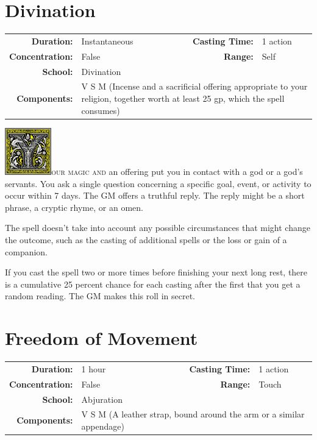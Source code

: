\documentclass[12pt,showtrims]{memoir}
\begin{document}
\section*{Divination}
{
\small\centering\vspace{-6pt}
\begin{tabular}{rlrl}
\toprule

\textbf{Duration:} & Instantaneous &
\textbf{Casting Time:} & 1 action \\
\textbf{Concentration:} & False &
\textbf{Range:} & Self \\
\textbf{School:} & Divination \\
\textbf{Components:} & \multicolumn{3}{p{0.7\textwidth}}{ V S M (Incense and a
sacrificial offering appropriate to your religion, together worth at least 25
gp, which the spell consumes)}\\

\bottomrule
\end{tabular}
}

\vspace{1\baselineskip}\noindent 
\lettrine[lines=4]{\includegraphics[height=58pt]{initials/Y.png}}{our magic and}
an offering put you in contact with a god or a god’s servants. You ask a single
question concerning a specific goal, event, or activity to occur within 7 days.
The GM offers a truthful reply. The reply might be a short phrase, a cryptic
rhyme, or an omen.

The spell doesn’t take into account any possible circumstances that might
change the outcome, such as the casting of additional spells or the loss or
gain of a companion.

If you cast the spell two or more times before finishing your next long rest,
there is a cumulative 25 percent chance for each casting after the first that
you get a random reading. The GM makes this roll in secret.

\newpage
\section*{Freedom of Movement}
{
\small\centering\vspace{-6pt}
\begin{tabular}{rlrl}
\toprule

\textbf{Duration:} & 1 hour  &
\textbf{Casting Time:} & 1 action  \\
\textbf{Concentration:} & False &
\textbf{Range:} & Touch \\
\textbf{School:} & Abjuration \\
\textbf{Components:} & \multicolumn{3}{p{0.7\textwidth}}{V S M (A leather strap, bound around the arm or a similar appendage)}\\

\bottomrule
\end{tabular}
}
\end{document}

